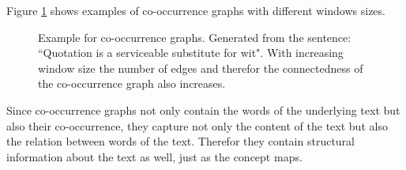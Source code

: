 Figure \ref{fig:cooccurrence_graphs} shows examples of co-occurrence graphs with different windows sizes.

\begin{figure}[ht]%
    \centering
    \caption{Example for co-occurrence graphs. Generated from the sentence: ``Quotation is a serviceable substitute for wit". With increasing window size the number of edges and therefor the connectedness of the co-occurrence graph also increases.}%
    \label{fig:cooccurrence_graphs}%
\end{figure}

Since co-occurrence graphs not only contain the words of the underlying text but also their co-occurrence, they capture not only the content of the text but also the relation between words of the text.
Therefor they contain structural information about the text as well, just as the concept maps.

